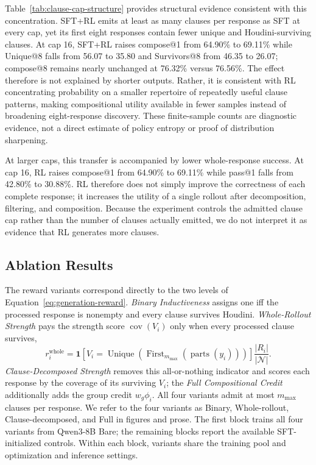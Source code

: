 Table~\ref{tab:clause-cap-structure} provides structural evidence consistent
with this concentration.  SFT+RL emits at least as many clauses per response as
SFT at every cap, yet its first eight responses contain fewer unique and
Houdini-surviving clauses.  At cap 16, SFT+RL raises compose@1 from 64.90\% to
69.11\% while Unique@8 falls from 56.07 to 35.80 and Survivors@8 from 46.35 to
26.07; compose@8 remains nearly unchanged at 76.32\% versus 76.56\%.  The
effect therefore is not explained by shorter outputs.  Rather, it is
consistent with RL concentrating probability on a smaller repertoire of
repeatedly useful clause patterns, making compositional utility available in
fewer samples instead of broadening eight-response discovery.  These
finite-sample counts are diagnostic evidence, not a direct estimate of policy
entropy or proof of distribution sharpening.

At larger caps, this transfer is accompanied by lower whole-response success.
At cap 16, RL raises compose@1 from 64.90\% to 69.11\% while pass@1 falls from
42.80\% to 30.88\%.  RL therefore does not simply improve the correctness of
each complete response; it increases the utility of a single rollout after
decomposition, filtering, and composition.  Because the experiment controls
the admitted clause cap rather than the number of clauses actually emitted,
we do not interpret it as evidence that RL generates more clauses.

\subsection{Ablation Results}
\label{app:ablation-definitions}

The reward variants correspond directly to the two levels of
Equation~\ref{eq:generation-reward}.  \emph{Binary Inductiveness} assigns one
iff the processed response is nonempty and every clause survives Houdini.
\emph{Whole-Rollout Strength} pays the strength score
\(\operatorname{cov}(V_i)\) only when every processed clause survives,
\[
  r_i^{\mathrm{whole}}
  =\mathbf 1[V_i=
    \operatorname{Unique}(\operatorname{First}_{m_{\max}}(
      \operatorname{parts}(y_i)))]
   \frac{|R_i|}{|\mathcal N|}.
\]
\emph{Clause-Decomposed Strength} removes this all-or-nothing indicator and
scores each response by the coverage of its surviving \(V_i\); the
\emph{Full Compositional Credit}
additionally adds the group credit \(w_g\phi_i\).  All four variants admit at
most \(m_{\max}\) clauses per response.  We refer to the four variants as
Binary, Whole-rollout, Clause-decomposed, and Full in figures and prose.
The first block trains all four variants from Qwen3-8B Bare; the remaining
blocks report the available SFT-initialized controls.  Within each block,
variants share the training pool and optimization and inference settings.

